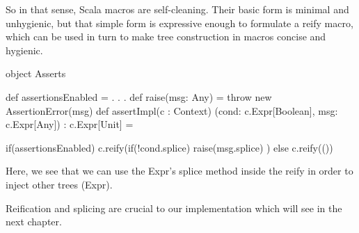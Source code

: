 So in that sense, Scala macros are self-cleaning. Their basic form is minimal
and unhygienic, but that simple form is expressive enough to formulate a
reify macro, which can be used in turn to make tree construction in
macros concise and hygienic.

object Asserts {
  def assertionsEnabled = . . .
  def raise(msg: Any) = throw new AssertionError(msg)
  def assertImpl(c : Context)
    (cond: c.Expr[Boolean], msg: c.Expr[Any])
    : c.Expr[Unit] = 
    
    if(assertionsEnabled)
      c.reify(if(!cond.splice) raise(msg.splice) )
    else
      c.reify(())
}

Here, we see that we can use the Expr's splice method inside the reify in order
to inject other trees (Expr).

Reification and splicing are crucial to our implementation which will see in
the next chapter.